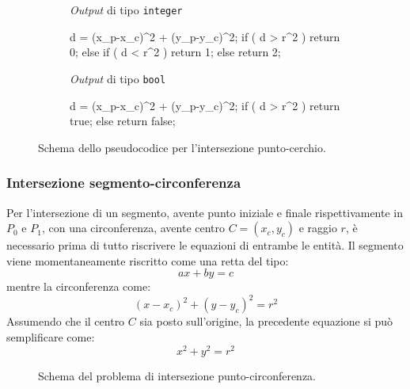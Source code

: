 \begin{figure}[h]
\hfill
	\begin{subfigure}[t]{.475\linewidth}
	\raggedright
	\textit{Output} di tipo \texttt{integer}\\
	\vspace{.5em}
	\begin{pseudoc}
	d = (x_p-x_c)^2 + (y_p-y_c)^2;
	if ( d > r^2 ){ return  0; }
	else if ( d < r^2 ){ return 1; }
	else { return 2; }
	\end{pseudoc}
	\end{subfigure}
\hfill
	\begin{subfigure}[t]{.475\textwidth}
	\raggedright
	\textit{Output} di tipo \texttt{bool}\\
	\vspace{1em}
	\begin{pseudoc}
	d = (x_p-x_c)^2 + (y_p-y_c)^2;
	if ( d > r^2 ){ return  true; }
	else { return false; }
	\end{pseudoc}	
	\end{subfigure}
\hfill
\caption{Schema dello pseudocodice per l'intersezione punto-cerchio.}
\label{Pointcircle}
\end{figure}
%
\subsubsection{Intersezione segmento-circonferenza}
Per l'intersezione di un segmento, avente punto iniziale e finale rispettivamente in $P_0$ e $P_1$, con una circonferenza, avente centro $C=(x_c,y_c)$ e raggio $r$, è necessario prima di tutto riscrivere le equazioni di entrambe le entità. Il segmento viene momentaneamente riscritto come una retta del tipo:
\begin{equation}
ax+by=c
\label{eqretta}
\end{equation}
mentre la circonferenza come:
\begin{equation}
(x-x_c)^2 + (y-y_c)^2 = r^2
\end{equation}
Assumendo che il centro $C$ sia posto sull'origine, la precedente equazione si può semplificare come:
\begin{equation}
x^2 + y^2 = r^2
\label{eqcircle}
\end{equation}
\begin{figure}[h]
	\centering
	\caption{Schema del problema di intersezione punto-circonferenza.}
\end{figure}

